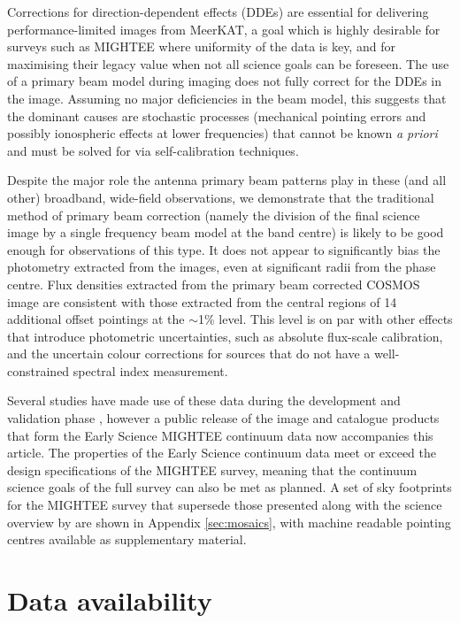 \documentclass[usenatbib,usedcolumn]{mnras}
\begin{document}
Corrections for direction-dependent effects (DDEs) are essential for delivering performance-limited images from MeerKAT, a goal which is highly desirable for surveys such as MIGHTEE where uniformity of the data is key, and for maximising their legacy value when not all science goals can be foreseen. The use of a primary beam model during imaging does not fully correct for the DDEs in the image. Assuming no major deficiencies in the beam model, this suggests that the dominant causes are stochastic processes (mechanical pointing errors and possibly ionospheric effects at lower frequencies) that cannot be known \emph{a priori} and must be solved for via self-calibration techniques.

Despite the major role the antenna primary beam patterns play in these (and all other) broadband, wide-field observations, we demonstrate that the traditional method of primary beam correction (namely the division of the final science image by a single frequency beam model at the band centre) is likely to be good enough for observations of this type. It does not appear to significantly bias the photometry extracted from the images, even at significant radii from the phase centre. Flux densities extracted from the primary beam corrected COSMOS image are consistent with those extracted from the central regions of 14 additional offset pointings at the $\sim$1\% level. This level is on par with other effects that introduce photometric uncertainties, such as absolute flux-scale calibration, and the uncertain colour corrections for sources that do not have a well-constrained spectral index measurement.

Several studies have made use of these data during the development and validation phase \citep[e.g.][]{pasini2020,delhaize2021,delvecchio2021}, however a public release of the image and catalogue products that form the Early Science MIGHTEE continuum data now accompanies this article. The properties of the Early Science continuum data meet or exceed the design specifications of the MIGHTEE survey, meaning that the continuum science goals of the full survey can also be met as planned. A set of sky footprints for the MIGHTEE survey that supersede those presented along with the science overview by \citet{jarvis2016} are shown in Appendix \ref{sec:mosaics}, with machine readable pointing centres available as supplementary material.

\section*{Data availability}
\end{document}
